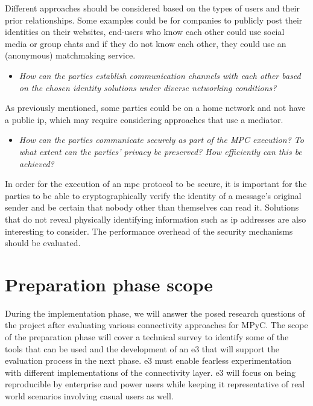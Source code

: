 Different approaches should be considered based on the types of users
and their prior relationships. Some examples could be for companies to
publicly post their identities on their websites, end-users who know
each other could use social media or group chats and if they do not know
each other, they could use an (anonymous) matchmaking service.

\begin{itemize}
\tightlist
\item
  \emph{How can the parties establish communication channels with each
  other based on the chosen identity solutions under diverse networking
  conditions?}
\end{itemize}

As previously mentioned, some parties could be on a home network and not
have a public \gls{ip}, which may require considering approaches that
use a mediator.

\begin{itemize}
\tightlist
\item
  \emph{How can the parties communicate securely as part of the MPC
  execution? To what extent can the parties' privacy be preserved? How
  efficiently can this be achieved?}
\end{itemize}

In order for the execution of an \gls{mpc} protocol to be secure, it is
important for the parties to be able to cryptographically verify the
identity of a message's original sender and be certain that nobody other
than themselves can read it. Solutions that do not reveal physically
identifying information such as \gls{ip} addresses are also interesting
to consider. The performance overhead of the security mechanisms should
be evaluated.

\hypertarget{preparation-phase-scope}{%
\section{Preparation phase scope}\label{preparation-phase-scope}}

During the implementation phase, we will answer the posed research
questions of the project after evaluating various connectivity
approaches for MPyC. The scope of the preparation phase will cover a
technical survey to identify some of the tools that can be used and the
development of an \gls{e3} that will support the evaluation process in
the next phase. \gls{e3} must enable fearless experimentation with
different implementations of the connectivity layer. \gls{e3} will focus
on being reproducible by enterprise and power users while keeping it
representative of real world scenarios involving casual users as well.

